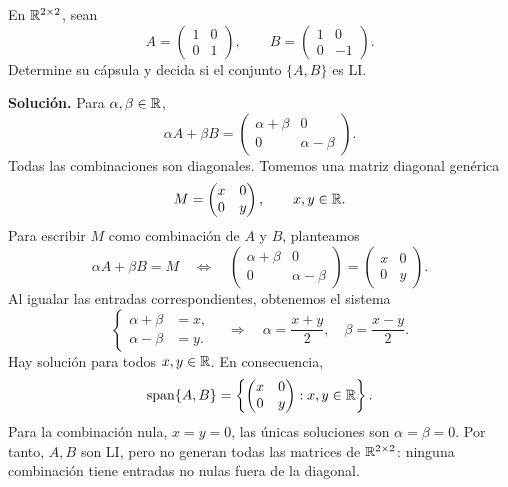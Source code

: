 \documentclass[compacto,10pt]{pubciencias-notas}
\begin{document}
\begin{ejem}
    En $\Mat[\R]{2}{2}$, sean
    \[
        A=\begin{pmatrix}1&0\\0&1\end{pmatrix},\qquad
        B=\begin{pmatrix}1&0\\0&-1\end{pmatrix}.
    \]
    Determine su cápsula y decida si el conjunto $\{A,B\}$ es LI.

    \textbf{Solución.} Para $\alpha,\beta\in\R$,
    \[
        \alpha A+\beta B=
        \begin{pmatrix}\alpha+\beta&0\\0&\alpha-\beta\end{pmatrix}.
    \]
    Todas las combinaciones son diagonales. Tomemos una matriz diagonal
    genérica
    \[
        M=\begin{pmatrix}x&0\\0&y\end{pmatrix},\qquad x,y\in\R.
    \]
    Para escribir $M$ como combinación de $A$ y $B$, planteamos
    \[
        \alpha A+\beta B=M
        \quad\Longleftrightarrow\quad
        \begin{pmatrix}\alpha+\beta&0\\0&\alpha-\beta\end{pmatrix}
        =\begin{pmatrix}x&0\\0&y\end{pmatrix}.
    \]
    Al igualar las entradas correspondientes, obtenemos el sistema
    \[
        \left\{\begin{aligned}\alpha+\beta&=x,\\\alpha-\beta&=y.\end{aligned}\right.
        \quad\Longrightarrow\quad
        \alpha=\frac{x+y}{2},\quad\beta=\frac{x-y}{2}.
    \]
    Hay solución para todos $x,y\in\R$. En consecuencia,
    \[
        \spn\{A,B\}=
        \left\{\begin{pmatrix}x&0\\0&y\end{pmatrix}:x,y\in\R\right\}.
    \]
    Para la combinación nula, $x=y=0$, las únicas soluciones son
    $\alpha=\beta=0$. Por tanto, $A,B$ son LI, pero no generan todas
    las matrices de $\Mat[\R]{2}{2}$: ninguna combinación tiene entradas
    no nulas fuera de la diagonal.
\end{ejem}
\end{document}
